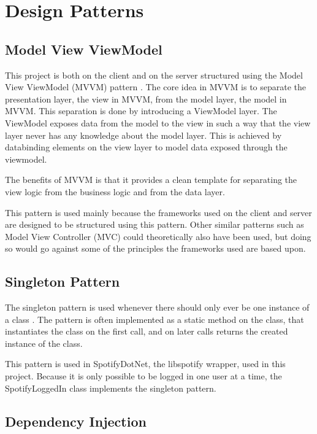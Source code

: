 \chapter{Design Patterns}

\section{Model View ViewModel}

This project is both on the client and on the server structured using
the Model View ViewModel (MVVM) pattern \cite{mvvm}. The core idea in MVVM is to
separate the presentation layer, the view in MVVM, from the model
layer, the model in MVVM. This separation is done by introducing a
ViewModel layer. The ViewModel exposes data from the model to the view
in such a way that the view layer never has any knowledge about the
model layer. This is achieved by databinding elements on the view
layer to model data exposed through the viewmodel.

The benefits of MVVM is that it provides a clean template for
separating the view logic from the business logic and from the data
layer.

This pattern is used mainly because the frameworks used on the client
and server are designed to be structured using this pattern. Other
similar patterns such as Model View Controller (MVC) could
theoretically also have been used, but doing so would go against some
of the principles the frameworks used are based upon.

\section{Singleton Pattern}

The singleton pattern is used whenever there should only ever be one
instance of a class \cite{skeet2013c}. The pattern is often implemented as a static
method on the class, that instantiates the class on the first call,
and on later calls returns the created instance of the class.

This pattern is used in SpotifyDotNet, the libspotify wrapper, used in
this project. Because it is only possible to be logged in one user at
a time, the SpotifyLoggedIn class implements the singleton pattern.

\section{Dependency Injection}


